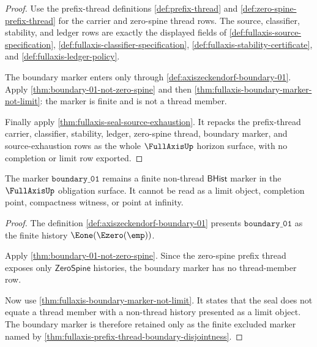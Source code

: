\begin{proof}
Use the prefix-thread definitions
\autoref{def:prefix-thread} and
\autoref{def:zero-spine-prefix-thread} for the carrier and zero-spine thread
rows. The source, classifier, stability, and ledger rows are exactly the
displayed fields of
\autoref{def:fullaxis-source-specification},
\autoref{def:fullaxis-classifier-specification},
\autoref{def:fullaxis-stability-certificate}, and
\autoref{def:fullaxis-ledger-policy}.

The boundary marker enters only through
\autoref{def:axiszeckendorf-boundary-01}. Apply
\autoref{thm:boundary-01-not-zero-spine} and then
\autoref{thm:fullaxis-boundary-marker-not-limit}: the marker is finite and is
not a thread member.

Finally apply \autoref{thm:fullaxis-seal-source-exhaustion}. It repacks the
prefix-thread carrier, classifier, stability, ledger, zero-spine thread,
boundary marker, and source-exhaustion rows as the whole $\FullAxisUp$ horizon
surface, with no completion or limit row exported.
\end{proof}

\begin{theorem}
\label{thm:fullaxis-boundary-marker-finite-obligation}
The marker $\mathtt{boundary\_01}$ remains a finite non-thread
$\mathsf{BHist}$ marker in the $\FullAxisUp$ obligation surface. It cannot be
read as a limit object, completion point, compactness witness, or point at
infinity.
\end{theorem}
\begin{proof}
The definition
\autoref{def:axiszeckendorf-boundary-01} presents
$\mathtt{boundary\_01}$ as the finite history
$\Eone(\Ezero(\emp))$.

Apply \autoref{thm:boundary-01-not-zero-spine}. Since the zero-spine prefix
thread exposes only $\mathsf{ZeroSpine}$ histories, the boundary marker has no
thread-member row.

Now use \autoref{thm:fullaxis-boundary-marker-not-limit}. It states that the
seal does not equate a thread member with a non-thread history presented as a
limit object. The boundary marker is therefore retained only as the finite
excluded marker named by
\autoref{thm:fullaxis-prefix-thread-boundary-disjointness}.
\end{proof}

